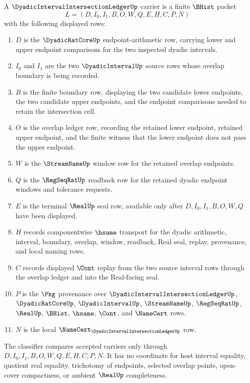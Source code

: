 \begin{definition}
\label{def:dyadic-interval-intersection-ledger-carrier}
A $\DyadicIntervalIntersectionLedgerUp$ carrier is a finite $\BHist$ packet
$$
L=(D,I_0,I_1,B,O,W,Q,E,H,C,P,N)
$$
with the following displayed rows:
\begin{enumerate}
\item $D$ is the $\DyadicRatCoreUp$ endpoint-arithmetic row, carrying lower and upper endpoint comparisons for the two inspected dyadic intervals.
\item $I_0$ and $I_1$ are the two $\DyadicIntervalUp$ source rows whose overlap boundary is being recorded.
\item $B$ is the finite boundary row, displaying the two candidate lower endpoints, the two candidate upper endpoints, and the endpoint comparisons needed to retain the intersection cell.
\item $O$ is the overlap ledger row, recording the retained lower endpoint, retained upper endpoint, and the finite witness that the lower endpoint does not pass the upper endpoint.
\item $W$ is the $\StreamNameUp$ window row for the retained overlap endpoints.
\item $Q$ is the $\RegSeqRatUp$ readback row for the retained dyadic endpoint windows and tolerance requests.
\item $E$ is the terminal $\RealUp$ seal row, available only after $D,I_0,I_1,B,O,W,Q$ have been displayed.
\item $H$ records componentwise $\hsame$ transport for the dyadic arithmetic, interval, boundary, overlap, window, readback, Real seal, replay, provenance, and local naming rows.
\item $C$ records displayed $\Cont$ replay from the two source interval rows through the overlap ledger and into the Real-facing seal.
\item $P$ is the $\Pkg$ provenance over $\DyadicIntervalIntersectionLedgerUp$, $\DyadicRatCoreUp$, $\DyadicIntervalUp$, $\StreamNameUp$, $\RegSeqRatUp$, $\RealUp$, $\BHist$, $\hsame$, $\Cont$, and $\NameCert$ rows.
\item $N$ is the local $\NameCert_{\DyadicIntervalIntersectionLedgerUp}$ row.
\end{enumerate}
The classifier compares accepted carriers only through $D,I_0,I_1,B,O,W,Q,E,H,C,P,N$. It has no coordinate for host interval equality, quotient real equality, trichotomy of endpoints, selected overlap points, open-cover compactness, or ambient $\RealUp$ completeness.
\end{definition}

